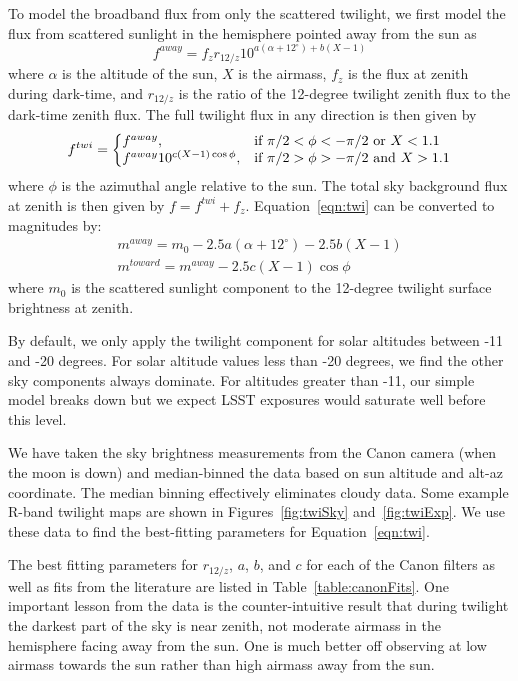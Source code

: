 \documentclass[]{spie}
\begin{document}
To model the broadband flux from only the scattered twilight, we first model the flux from scattered sunlight in the hemisphere pointed away from the sun as
\begin{equation}\label{eqn:twi1}
  f^{away} = f_{z} r_{12/z} 10^{a(\alpha+12^{\circ})+b(X-1)}
\end{equation}
where $\alpha$ is the altitude of the sun, $X$ is the airmass, $f_{z}$ is the flux at zenith during dark-time, and $r_{12/z}$ is the ratio of the 12-degree twilight zenith flux to the dark-time zenith flux. The full twilight flux in any direction is then given by
\begin{equation}
  \label{eqn:twi}
  f^{twi}  = \left\{
  \begin{array}{@{}ll@{}}
        f^{away}, & \text{if}\  \pi/2 < \phi < -\pi/2  \text{ or } X < 1.1\\
        f^{away} 10^{c (X-1) \cos{\phi}}, &  \text{if}\   \pi/2 > \phi >  -\pi/2 \text{ and } X > 1.1
        \end{array} \right.
\end{equation}
where $\phi$ is the azimuthal angle relative to the sun. The total sky background flux at zenith is then given by $f = f^{twi} + f_{z}$. Equation~\ref{eqn:twi} can be converted to magnitudes by:
\begin{eqnarray}
  m^{away} = m_0 -2.5a(\alpha+12^{\circ})-2.5b(X-1) \\
  m^{toward} = m^{away} -2.5c(X-1)\cos{\phi}
\end{eqnarray}
where $m_0$ is the scattered sunlight component to the 12-degree twilight surface brightness at zenith.  

By default, we only apply the twilight component for solar altitudes between -11 and -20 degrees. For solar altitude values less than -20 degrees, we find the other sky components always dominate. For altitudes greater than -11, our simple model breaks down but we expect LSST exposures would saturate well before this level.  

We have taken the sky brightness measurements from the Canon camera (when the moon is down) and median-binned the data based on sun altitude and alt-az coordinate.  The median binning effectively eliminates cloudy data.  Some example R-band twilight maps are shown in Figures~\ref{fig:twiSky} and~\ref{fig:twiExp}.  We use these data to find the best-fitting parameters for Equation~\ref{eqn:twi}.  

The best fitting parameters for $r_{12/z}$, $a$, $b$, and $c$ for each of the Canon filters as well as fits from the literature are listed in Table~\ref{table:canonFits}.  One important lesson from the data is the counter-intuitive result that during twilight the darkest part of the sky is near zenith, not moderate airmass in the hemisphere facing away from the sun. One is much better off observing at low airmass towards the sun rather than high airmass away from the sun.
\end{document}
